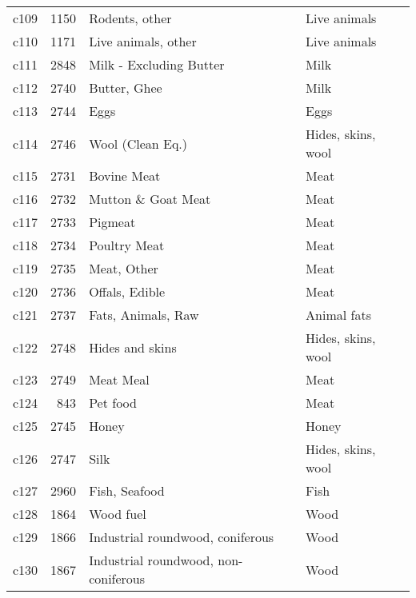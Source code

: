 \documentclass[]{article}
\begin{document}
\begin{longtable}[t]{lrll}
c109 & 1150 & Rodents, other & Live animals\\
c110 & 1171 & Live animals, other & Live animals\\
\addlinespace
c111 & 2848 & Milk - Excluding Butter & Milk\\
c112 & 2740 & Butter, Ghee & Milk\\
c113 & 2744 & Eggs & Eggs\\
c114 & 2746 & Wool (Clean Eq.) & Hides, skins, wool\\
c115 & 2731 & Bovine Meat & Meat\\
\addlinespace
c116 & 2732 & Mutton \& Goat Meat & Meat\\
c117 & 2733 & Pigmeat & Meat\\
c118 & 2734 & Poultry Meat & Meat\\
c119 & 2735 & Meat, Other & Meat\\
c120 & 2736 & Offals, Edible & Meat\\
\addlinespace
c121 & 2737 & Fats, Animals, Raw & Animal fats\\
c122 & 2748 & Hides and skins & Hides, skins, wool\\
c123 & 2749 & Meat Meal & Meat\\
c124 & 843 & Pet food & Meat\\
c125 & 2745 & Honey & Honey\\
\addlinespace
c126 & 2747 & Silk & Hides, skins, wool\\
c127 & 2960 & Fish, Seafood & Fish\\
c128 & 1864 & Wood fuel & Wood\\
c129 & 1866 & Industrial roundwood, coniferous & Wood\\
c130 & 1867 & Industrial roundwood, non-coniferous & Wood\\*
\end{longtable}
\end{document}
